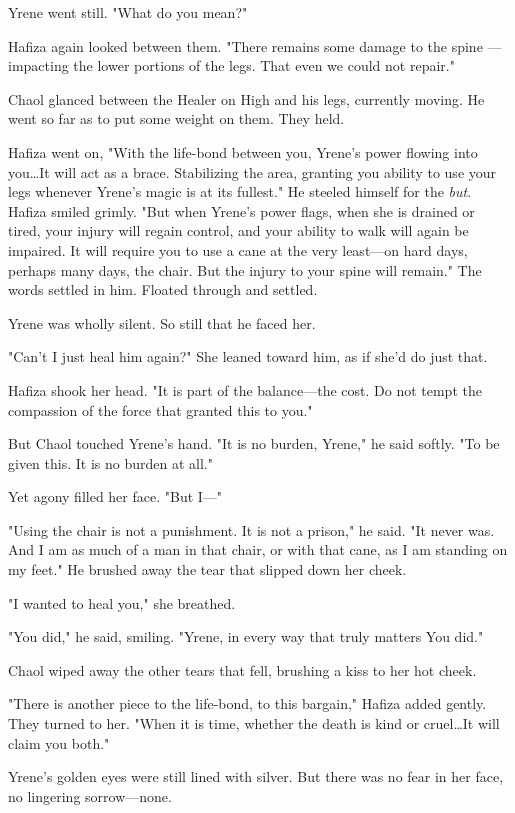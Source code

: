 Yrene went still.
"What do you mean?"

Hafiza again looked between them.
"There remains some damage to the spine ---impacting the lower portions of the legs.
That even we could not repair."

Chaol glanced between the Healer on High and his legs, currently moving.
He went so far as to put some weight on them.
They held.

Hafiza went on, "With the life-bond between you, Yrene's power flowing into you\ldots It will act as a brace.
Stabilizing the area, granting you ability to use your legs whenever Yrene's magic is at its fullest."
He steeled himself for the \emph{but}.
Hafiza smiled grimly.
"But when Yrene's power flags, when she is drained or tired, your injury will regain control, and your ability to walk will again be impaired.
It will require you to use a cane at the very least---on hard days, perhaps many days, the chair.
But the injury to your spine will remain."
The words settled in him.
Floated through and settled.

Yrene was wholly silent.
So still that he faced her.

"Can't I just heal him again?"
She leaned toward him, as if she'd do just that.

Hafiza shook her head.
"It is part of the balance---the cost.
Do not tempt the compassion of the force that granted this to you."

But Chaol touched Yrene's hand.
"It is no burden, Yrene," he said softly.
"To be given this.
It is no burden at all."

Yet agony filled her face.
"But I---"

"Using the chair is not a punishment.
It is not a prison," he said.
"It never was.
And I am as much of a man in that chair, or with that cane, as I am standing on my feet."
He brushed away the tear that slipped down her cheek.

"I wanted to heal you," she breathed.

"You did," he said, smiling.
"Yrene, in every way that truly matters  You did."

Chaol wiped away the other tears that fell, brushing a kiss to her hot cheek.

"There is another piece to the life-bond, to this bargain," Hafiza added gently.
They turned to her.
"When it is time, whether the death is kind or cruel\ldots It will claim you both."

Yrene's golden eyes were still lined with silver.
But there was no fear in her face, no lingering sorrow---none.

